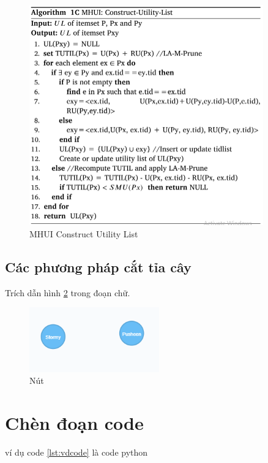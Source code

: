 \begin{figure}[h]
\centering
\includegraphics[width=0.9\textwidth]{image/algo/algo3.PNG}
\caption{\label{fig:algo2} MHUI Construct Utility List}
\end{figure}

\subsection{Các phương pháp cắt tỉa cây}




Trích dẫn hình \ref{fig:node} trong đoạn chữ. 

\begin{figure}[h]
\centering
\includegraphics[width=0.5\textwidth]{image/node.PNG}
\caption{\label{fig:node} Nút}
\end{figure}


\section{Chèn đoạn code}


ví dụ code \ref{lst:vdcode} là code python 


